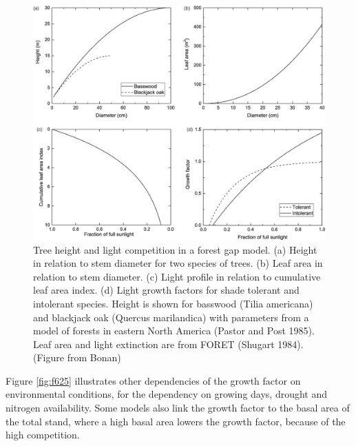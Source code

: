 \documentclass[12pt,oneside]{book}
\begin{document}
\begin{figure}

{\centering \includegraphics[width=0.8\linewidth]{figures/chap6/f624_growthfactor} 

}

\caption{Tree height and light competition in a forest gap model. (a) Height in relation to stem diameter for two species of trees. (b) Leaf area in relation to stem diameter. (c) Light profile in relation to cumulative leaf area index. (d) Light growth factors for shade tolerant and intolerant species. Height is shown for basswood (Tilia americana) and blackjack oak (Quercus marilandica) with parameters from a model of forests in eastern North America (Pastor and Post 1985). Leaf area and light extinction are from FORET (Shugart 1984). (Figure from Bonan)}\label{fig:f624}
\end{figure}

Figure \ref{fig:f625} illustrates other dependencies of the growth
factor on environmental conditions, for the dependency on growing days,
drought and nitrogen availability. Some models also link the growth
factor to the basal area of the total stand, where a high basal area
lowers the growth factor, because of the high competition.
\end{document}
